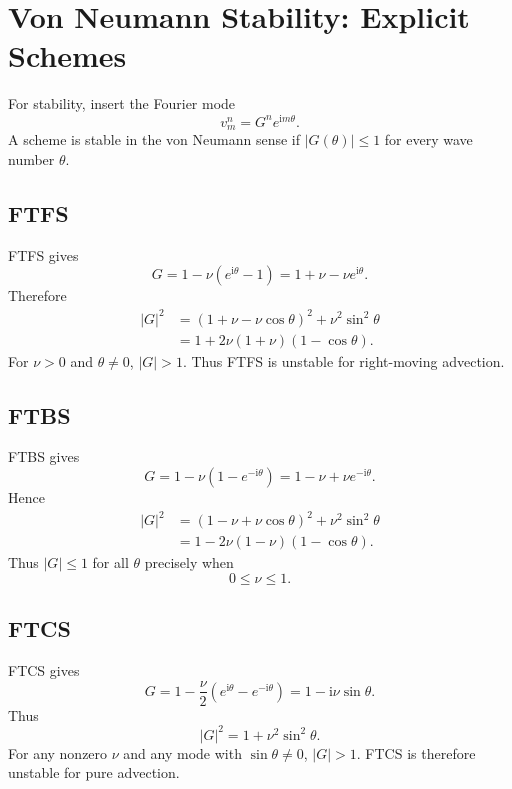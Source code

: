 \documentclass[11pt]{article}
\newcommand{\ii}{\mathrm{i}}
\begin{document}
\section{Von Neumann Stability: Explicit Schemes}

For stability, insert the Fourier mode
\begin{equation}
    v_m^n=G^n e^{\ii m\theta}.
\end{equation}
A scheme is stable in the von Neumann sense if $|G(\theta)|\le 1$ for every wave number $\theta$.

\subsection{FTFS}

FTFS gives
\begin{equation}
    G=1-\nu(e^{\ii\theta}-1)=1+\nu-\nu e^{\ii\theta}.
\end{equation}
Therefore
\begin{align}
    |G|^2
    &=
    (1+\nu-\nu\cos\theta)^2+\nu^2\sin^2\theta\\
    &=
    1+2\nu(1+\nu)(1-\cos\theta).
\end{align}
For $\nu>0$ and $\theta\ne 0$, $|G|>1$.  Thus FTFS is unstable for right-moving advection.

\subsection{FTBS}

FTBS gives
\begin{equation}
    G=1-\nu(1-e^{-\ii\theta})
    =
    1-\nu+\nu e^{-\ii\theta}.
\end{equation}
Hence
\begin{align}
    |G|^2
    &=
    (1-\nu+\nu\cos\theta)^2+\nu^2\sin^2\theta\\
    &=
    1-2\nu(1-\nu)(1-\cos\theta).
\end{align}
Thus $|G|\le 1$ for all $\theta$ precisely when
\begin{equation}
    0\le \nu\le 1.
\end{equation}

\subsection{FTCS}

FTCS gives
\begin{equation}
    G=1-\frac{\nu}{2}(e^{\ii\theta}-e^{-\ii\theta})
    =
    1-\ii\nu\sin\theta.
\end{equation}
Thus
\begin{equation}
    |G|^2=1+\nu^2\sin^2\theta.
\end{equation}
For any nonzero $\nu$ and any mode with $\sin\theta\ne0$, $|G|>1$.  FTCS is therefore unstable for pure advection.
\end{document}
